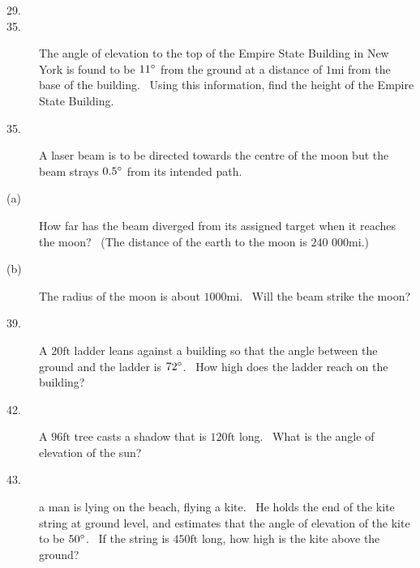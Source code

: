 \begin{description}
\item [29.]   
\columnsep =30pt
 

\item [35.]
The angle of elevation to the top of the Empire State Building in New York is found to be $11 \mbox{{\ensuremath{{}^\circ}}}$ from the ground at a distance of $1 \mbox{mi}$ from the base of the building. \ Using this information,
find the height of the Empire State Building. 

\item [35.]
A laser beam is to be directed towards the centre of the moon but the beam strays $0.5 \mbox{{\ensuremath{{}^\circ}}}$ from its intended path. 

\item [(a)]
How far has the beam diverged from its assigned target when it reaches the moon? \ (The distance of the earth
to the moon is $240$ $000 \mbox{mi}\text{.}$) 

\item [(b)] The radius
of the moon is about $1000 \mbox{mi}$. \ Will the beam strike the moon? 

\item [39.]
A $20 \mbox{ft}$ ladder leans against a building so that the angle between the ground and the ladder is $72 \mbox{{\ensuremath{{}^\circ}}}$. \ How high does the ladder reach on the building?


\item [42.] A $96 \mbox{ft}$ tree casts a shadow that is $120 \mbox{ft}$ long. \ What is the angle of elevation of the sun?


\item [43.] a man is lying on the beach, flying a kite. \ He
holds the end of the kite string at ground level, and estimates that the angle of elevation of the kite to be $50 \mbox{{\ensuremath{{}^\circ}}}$. \ If the string is $450 \mbox{ft}$ long, how high is the kite above the ground? 


\end{description}

